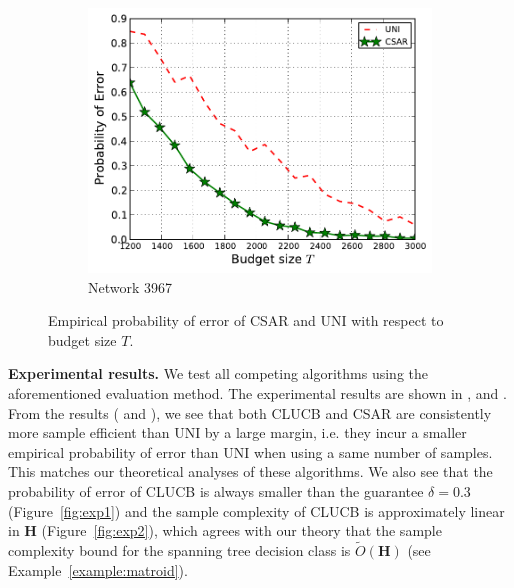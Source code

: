 \documentclass{article}
\newcommand{\Algorithm}{{\small \textsf{CLUCB}}\xspace}
\newcommand{\AlgorithmBud}{{\small \textsf{CSAR}}\xspace}
\newcommand{\Uniform}{{\small \textsf{UNI}}\xspace}
\newcommand{\Problem}{{CPE}\xspace}
\begin{document}
\begin{figure}[htbp]
\begin{subfigure}[c]{\imgsize\textwidth}
	\includegraphics[width=\textwidth]{fig/exp/mst-3967}
	\caption{Network 3967}
\end{subfigure}
\caption{Empirical probability of error of \AlgorithmBud and \Uniform with respect to budget size $T$.}
\label{fig:exp3}
\end{figure}



\textbf{Experimental results.}
We test all competing algorithms using the aforementioned evaluation method.
The experimental results are shown in ,  and .
From the results ( and ), we see that both \Algorithm and \AlgorithmBud are consistently more sample efficient than \Uniform by a large margin, i.e. they incur a smaller empirical probability of error than \Uniform when using a same number of samples.
This matches our theoretical analyses of these algorithms.
We also see that the probability of error of \Algorithm is always smaller than the guarantee $\delta=0.3$ (Figure~\ref{fig:exp1}) and the sample complexity of \Algorithm is approximately linear in $\mathbf H$ (Figure~\ref{fig:exp2}), which agrees with our theory that the sample complexity bound for the spanning tree decision class is $\tilde O(\mathbf H)$ (see Example~\ref{example:matroid}).









\end{document}
